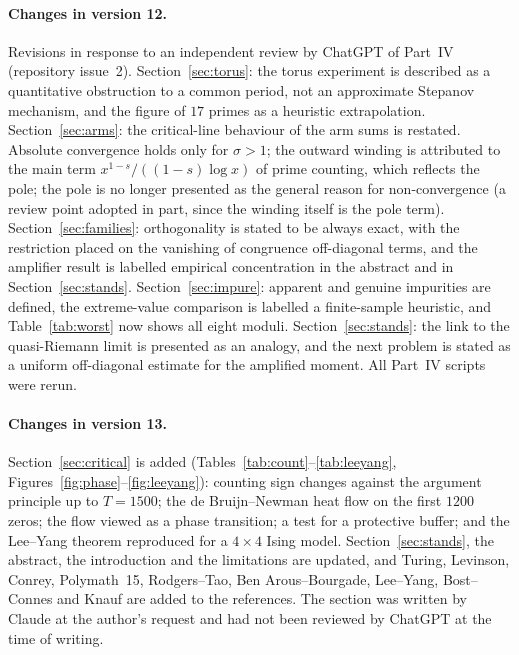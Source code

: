 \documentclass[11pt,a4paper]{article}
\theoremstyle{definition}\newtheorem{definition}[proposition]{Definition}
\theoremstyle{remark}\newtheorem{remark}[proposition]{Remark}
\begin{document}
\paragraph{Changes in version 12.} Revisions in response to an independent review by ChatGPT of Part~IV (repository issue~2). Section~\ref{sec:torus}: the torus experiment is described as a quantitative obstruction to a common period, not an approximate Stepanov mechanism, and the figure of $17$ primes as a heuristic extrapolation. Section~\ref{sec:arms}: the critical-line behaviour of the arm sums is restated. Absolute convergence holds only for $\sigma>1$; the outward winding is attributed to the main term $x^{1-s}/((1-s)\log x)$ of prime counting, which reflects the pole; the pole is no longer presented as the general reason for non-convergence (a review point adopted in part, since the winding itself is the pole term). Section~\ref{sec:families}: orthogonality is stated to be always exact, with the restriction placed on the vanishing of congruence off-diagonal terms, and the amplifier result is labelled empirical concentration in the abstract and in Section~\ref{sec:stands}. Section~\ref{sec:impure}: apparent and genuine impurities are defined, the extreme-value comparison is labelled a finite-sample heuristic, and Table~\ref{tab:worst} now shows all eight moduli. Section~\ref{sec:stands}: the link to the quasi-Riemann limit is presented as an analogy, and the next problem is stated as a uniform off-diagonal estimate for the amplified moment. All Part~IV scripts were rerun.

\paragraph{Changes in version 13.} Section~\ref{sec:critical} is added (Tables~\ref{tab:count}--\ref{tab:leeyang}, Figures~\ref{fig:phase}--\ref{fig:leeyang}): counting sign changes against the argument principle up to $T=1500$; the de Bruijn--Newman heat flow on the first $1200$ zeros; the flow viewed as a phase transition; a test for a protective buffer; and the Lee--Yang theorem reproduced for a $4\times4$ Ising model. Section~\ref{sec:stands}, the abstract, the introduction and the limitations are updated, and Turing, Levinson, Conrey, Polymath~15, Rodgers--Tao, Ben Arous--Bourgade, Lee--Yang, Bost--Connes and Knauf are added to the references. The section was written by Claude at the author's request and had not been reviewed by ChatGPT at the time of writing.
\end{document}

